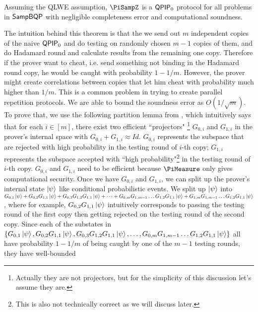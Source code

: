 \begin{theorem}\label{thm:qpip0}
	Assuming the QLWE assumption, $\PiSampZ$ is a $\operatorname{\mathsf{QPIP}}_0$ protocol for all problems in $\operatorname{\mathsf{SampBQP}}$ with negligible completeness error and computational soundness.
\end{theorem}


The intuition behind this theorem is that the we send out $m$ independent copies of the naive $\operatorname{\mathsf{QPIP}}_0$ and do testing on randomly chosen $m-1$ copies of them, and do Hadamard round and calculate results from the remaining one copy. Therefore if the prover want to cheat, i.e. send something not binding in the Hadamard round copy, he would be caught with probability $1-1/m$. However, the prover might create correlations between copies that let him cheat with probability much higher than $1/m$. This is a common problem in trying to create parallel repetition protocols. We are able to bound the soundness error as $O(1/\sqrt{m})$. To prove that, we use the following partition lemma from \cite{arXiv:ChiaChungYam19}, which intuitively says that for each $i\in[m]$, there exist two efficient ``projectors" \footnote{Actually they are not projectors, but for the simplicity of this discussion let's assume they are.} $G_{0,i}$ and $G_{1,i}$ in the prover's internal space with $G_{0,i}+G_{1,i} \approx Id$.  $G_{0,i}$ represents the subspace that are rejected with high probability in the testing round of $i$-th copy; $G_{1,i}$  represents the subspace accepted with ``high probability"\footnote{This is also not technically correct as we will discuss later.} in the testing round of $i$-th copy.  $G_{0,i}$ and $G_{1,i}$ need to be efficient because $\PiMeasure$ only gives computational security. Once we have $G_{0,i}$ and $G_{1,i}$, we can split up the prover's internal state $\ket{\psi}$ like conditional probabilistic events.  We  split up  $\ket{\psi}$ into $G_{0,1}\ket{\psi}+ G_{0,2}G_{1,1}\ket{\psi} + G_{0,3}G_{1,2}G_{1,1}\ket{\psi} + \dots +  G_{0,m} G_{1,m-1}\dots G_{1,2}G_{1,1}\ket{\psi} + G_{1,m} G_{1,m-1}\dots G_{1,2}G_{1,1}\ket{\psi}$, where for example, $G_{0,2}G_{1,1}\ket{\psi}$ intuitively corresponds to passing the testing round of the first copy then getting rejected on the testing round of the second copy. Since each of the  substates in  $\{G_{0,1}\ket{\psi}, G_{0,2}G_{1,1}\ket{\psi} , G_{0,3}G_{1,2}G_{1,1}\ket{\psi} , \dots ,  G_{0,m} G_{1,m-1}\dots G_{1,2}G_{1,1}\ket{\psi} \}$ all have  probability $1-1/m$ of being caught by one of the $m-1$ testing rounds, they have well-bounded 
